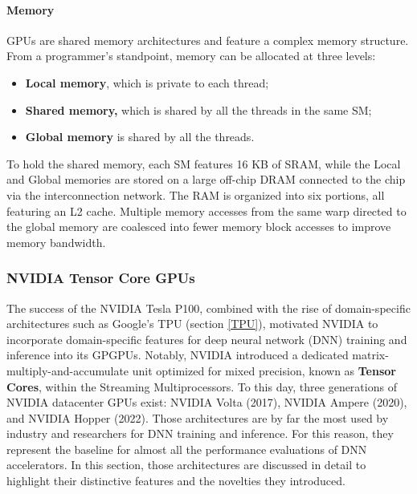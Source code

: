 \documentclass[conference]{IEEEtran}
\begin{document}
\paragraph{Memory}
GPUs are shared memory architectures and feature a complex memory structure.
From a programmer's standpoint, memory can be allocated at three levels:
\begin{itemize}
    \item \textbf{Local memory}, which is private to each thread;
    \item \textbf{Shared memory,} which is shared by all the threads in the same SM;
    \item \textbf{Global memory} is shared by all the threads.
\end{itemize}
To hold the shared memory, each SM features 16 KB of SRAM, while the Local and Global memories are stored on a large off-chip DRAM connected to the chip via the interconnection network. The  RAM is organized into six portions, all featuring an L2 cache. Multiple memory accesses from the same warp directed to the global memory are coalesced into fewer memory block accesses to improve memory bandwidth.

\subsubsection{NVIDIA Tensor Core GPUs}
The success of the NVIDIA Tesla P100, combined with the rise of domain-specific architectures such as Google's TPU (section \ref{TPU}), motivated NVIDIA to incorporate domain-specific features for deep neural network (DNN) training and inference into its GPGPUs. Notably, NVIDIA introduced a dedicated matrix-multiply-and-accumulate unit optimized for mixed precision, known as \textbf{Tensor Cores}, within the Streaming Multiprocessors.
To this day, three generations of NVIDIA datacenter GPUs exist: NVIDIA Volta (2017), NVIDIA Ampere (2020), and NVIDIA Hopper (2022).
Those architectures are by far the most used by industry and researchers for DNN training and inference. For this reason, they represent the baseline for almost all the performance evaluations of DNN accelerators.
In this section, those architectures are discussed in detail to highlight their distinctive features and the novelties they introduced.
\end{document}
